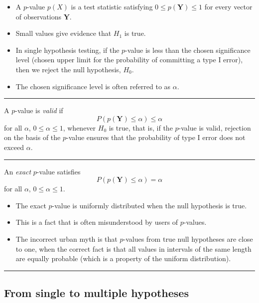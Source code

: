 \documentclass[
  letterpaper,
  DIV=11,
  numbers=noendperiod]{scrartcl}
\providecommand{\tightlist}{%
  \setlength{\itemsep}{0pt}\setlength{\parskip}{0pt}}\usepackage{longtable,booktabs,array}
\begin{document}
\begin{itemize}
\tightlist
\item
  A \(p\)-value \(p(X)\) is a test statistic satisfying
  \(0 \leq p({\boldsymbol Y}) \leq 1\) for every vector of observations
  \(\boldsymbol{Y}\).
\item
  Small values give evidence that \(H_1\) is true.
\item
  In single hypothesis testing, if the \(p\)-value is less than the
  chosen significance level (chosen upper limit for the probability of
  committing a type I error), then we reject the null hypothesis,
  \(H_0\).
\item
  The chosen significance level is often referred to as \(\alpha\).
\end{itemize}

\begin{center}\rule{0.5\linewidth}{0.5pt}\end{center}

A \(p\)-value is \emph{valid} if
\[ P(p(\boldsymbol{Y}) \leq \alpha) \leq \alpha \] for all \(\alpha\),
\(0 \leq \alpha \leq 1\), whenever \(H_0\) is true, that is, if the
\(p\)-value is valid, rejection on the basis of the \(p\)-value ensures
that the probability of type I error does not exceed \(\alpha\).

\begin{center}\rule{0.5\linewidth}{0.5pt}\end{center}

An \emph{exact} \(p\)-value satisfies
\[P(p(\boldsymbol{Y}) \leq \alpha) = \alpha\] for all \(\alpha\),
\(0 \leq \alpha \leq 1\).

\begin{itemize}
\tightlist
\item
  The exact \(p\)-value is uniformly distributed when the null
  hypothesis is true.
\item
  This is a fact that is often misunderstood by users of \(p\)-values.
\item
  The incorrect urban myth is that \(p\)-values from true null
  hypotheses are close to one, when the correct fact is that all values
  in intervals of the same length are equally probable (which is a
  property of the uniform distribution).
\end{itemize}

\begin{center}\rule{0.5\linewidth}{0.5pt}\end{center}

\hypertarget{from-single-to-multiple-hypotheses}{%
\subsection{From single to multiple
hypotheses}\label{from-single-to-multiple-hypotheses}}
\end{document}
